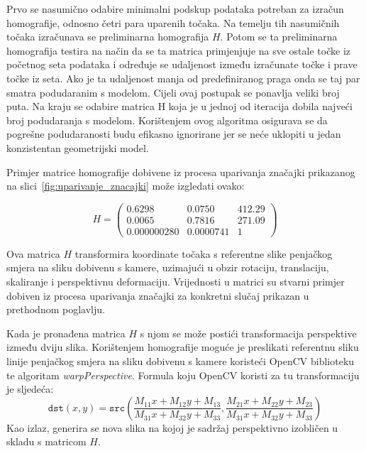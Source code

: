 Prvo se nasumično odabire minimalni podskup podataka potreban za izračun homografije, odnosno četri para uparenih točaka. Na temelju tih nasumičnih točaka izračunava se preliminarna homografija $H$. Potom se ta preliminarna homografija testira na način da se ta matrica primjenjuje na sve ostale točke iz početnog seta podataka i određuje se udaljenost između izračunate točke i prave točke iz seta. Ako je ta udaljenost manja od predefiniranog praga onda se taj par smatra podudaranim s modelom. Cijeli ovaj postupak se ponavlja veliki broj puta. 
Na kraju se odabire matrica H koja je u jednoj od iteracija dobila najveći broj podudaranja s modelom. Korištenjem ovog algoritma osigurava se da pogrešne podudaranosti budu efikasno ignorirane jer se neće uklopiti u jedan konzistentan geometrijski model.

Primjer matrice homografije dobivene iz procesa uparivanja značajki prikazanog na slici~\ref{fig:uparivanje_znacajki} može izgledati ovako:


\begin{equation}
    H =
    \begin{pmatrix}
        0.6298 & 0.0750 & 412.29 \\
        0.0065 & 0.7816 & 271.09 \\
        0.000000280 & 0.0000741 & 1
    \end{pmatrix}
\end{equation}

Ova matrica $H$ transformira koordinate točaka s referentne slike penjačkog smjera na sliku dobivenu s kamere, uzimajući u obzir rotaciju, translaciju, skaliranje i perspektivnu deformaciju. Vrijednosti u matrici su stvarni primjer dobiven iz procesa uparivanja značajki za konkretni slučaj prikazan u prethodnom poglavlju.




Kada je pronađena matrica $H$ s njom se može postići transformacija perspektive između dviju slika. Korištenjem homografije moguće je preslikati referentnu sliku linije penjačkog smjera na sliku dobivenu s kamere koristeći OpenCV biblioteku te algoritam \textit{warpPerspective}. Formula koju OpenCV koristi za tu transformaciju je sljedeća:
\begin{equation}
    \texttt{dst}(x,y) = \texttt{src} \left ( \frac{M_{11} x + M_{12} y + M_{13}}{M_{31} x + M_{32} y + M_{33}} ,
     \frac{M_{21} x + M_{22} y + M_{23}}{M_{31} x + M_{32} y + M_{33}} \right )
\end{equation}
Kao izlaz, generira se nova slika na kojoj je sadržaj perspektivno izobličen u skladu s matricom $H$. 

